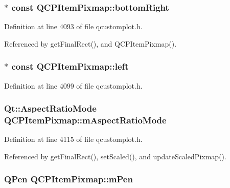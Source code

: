 \subsubsection[{bottom\+Right}]{$\ast$ const Q\+C\+P\+Item\+Pixmap\+::bottom\+Right}\label{class_q_c_p_item_pixmap_abcc38063f9502b876bf6615c45cc0994}


Definition at line 4093 of file qcustomplot.\+h.



Referenced by get\+Final\+Rect(), and Q\+C\+P\+Item\+Pixmap().

\hypertarget{class_q_c_p_item_pixmap_a8c85fcb8cb8ce292859a0499d16539b1}{}
\subsubsection[{left}]{$\ast$ const Q\+C\+P\+Item\+Pixmap\+::left}\label{class_q_c_p_item_pixmap_a8c85fcb8cb8ce292859a0499d16539b1}


Definition at line 4099 of file qcustomplot.\+h.

\hypertarget{class_q_c_p_item_pixmap_a8dc6b6c1e106ac523efae22d5fe55bab}{}
\subsubsection[{m\+Aspect\+Ratio\+Mode}]{\setlength{\rightskip}{0pt plus 5cm}Qt\+::\+Aspect\+Ratio\+Mode Q\+C\+P\+Item\+Pixmap\+::m\+Aspect\+Ratio\+Mode\hspace{0.3cm}{\ttfamily [protected]}}\label{class_q_c_p_item_pixmap_a8dc6b6c1e106ac523efae22d5fe55bab}


Definition at line 4115 of file qcustomplot.\+h.



Referenced by get\+Final\+Rect(), set\+Scaled(), and update\+Scaled\+Pixmap().

\hypertarget{class_q_c_p_item_pixmap_acfee1124eb51a1887aaf8de10777c7a1}{}
\subsubsection[{m\+Pen}]{\setlength{\rightskip}{0pt plus 5cm}Q\+Pen Q\+C\+P\+Item\+Pixmap\+::m\+Pen\hspace{0.3cm}{\ttfamily [protected]}}\label{class_q_c_p_item_pixmap_acfee1124eb51a1887aaf8de10777c7a1}


